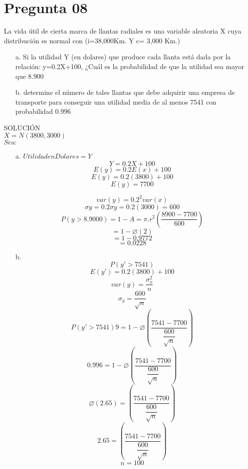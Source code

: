 \documentclass[10pt,a4paper]{article}
\begin{document}
\section{Pregunta 08}
La vida útil de cierta marca de llantas radiales es una variable aleatoria X cuya distribución es normal con (i=38,000Km. Y c= 3,000 Km.) \\
\begin{itemize}
\item[a.]Si la utilidad Y (en dolares) que produce cada llanta está dada por la relación: y=0.2X+100, ¿Cuál es la probabilidad de que la utilidad sea mayor que 8.900
\item[b.]determine el número de tales llantas que debe adquirir una empresa de transporte para conseguir una utilidad media de al menos 7541 con probabilidad 0.996
\end{itemize}
SOLUCIÓN\\
$X = N(3800,3000)$\\
$Sea:$\\
\begin{itemize}
\item[a.] 
$Utilidad en Dolares = Y$
$$Y = 0.2X+100$$
$$E(y) = 0.2E(x)+100$$
$$E(y) = 0.2(3800)+100$$
$$E(y) = 7700$$

$$var(y) = 0.2^2var(x)$$
$$\sigma{y} = 0.2\sigma{y} = 0.2(3000) = 600$$
$$P(y>8.9000) = 1-A = \pi.r^{2}(\dfrac{8900-7700}{600})$$
$$= 1 - \varnothing(2)$$
$$= 1-0.9772$$
$$= 0.0228$$

\item[b.]
$$P(y'>7541)$$
$$E(y') = 0.2(3800)+100$$
$$var(y) = \dfrac{\sigma_{x}^2}{n}$$
$$\sigma_{y} = \dfrac{600}{\sqrt{n}}$$
$$P(y'>7541)9 = 1-\varnothing(\dfrac{7541-7700}{\dfrac{600}{\sqrt{n}}})$$
$$0.996 = 1-\varnothing(\dfrac{7541-7700}{\dfrac{600}{\sqrt{n}}})$$
$$\varnothing(2.65) = (\dfrac{7541-7700}{\dfrac{600}{\sqrt{n}}})$$
$$2.65 = (\dfrac{7541-7700}{\dfrac{600}{\sqrt{n}}})$$
$$n = 100$$  
\end{itemize}
\end{document}

